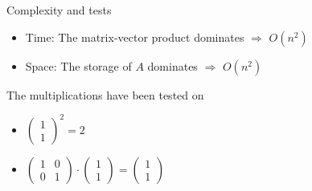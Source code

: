 \documentclass{beamer}
\begin{document}
\begin{frame}{Complexity and tests}
\begin{itemize}
\item {Time:} The matrix-vector product dominates $\Rightarrow$ $O(n^2)$
\bigskip
\item {Space:} The storage of $A$ dominates $\Rightarrow$ $O(n^2)$
\end{itemize}
\bigskip
The multiplications have been tested on
\begin{itemize}
\item $\begin{pmatrix}
1 \\
1
\end{pmatrix}^2 = 2
$
\item $
\begin{pmatrix}
1 & 0\\
0 & 1
\end{pmatrix}
\cdot
\begin{pmatrix}
1\\
1
\end{pmatrix} = 
\begin{pmatrix}
1\\
1
\end{pmatrix}
$
\end{itemize}
\end{frame}
\end{document}
